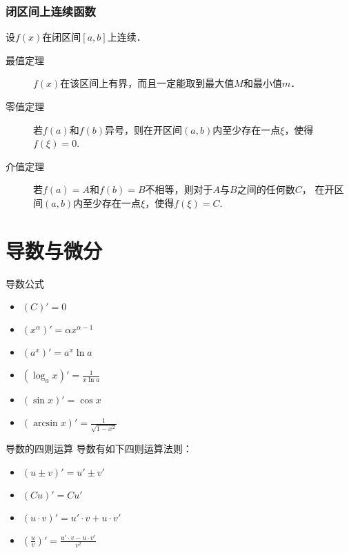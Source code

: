 \documentclass[14pt,notheorems,leqno,xcolor={rgb}]{beamer} %
\begin{document}
\begin{frame}
\frametitle{闭区间上连续函数}
设$f(x)$在闭区间$[a,b]$上连续．\vpause
\begin{description}
  \item[最值定理] $f(x)$在该区间上有界，而且一定能取到最大值$M$和最小值$m$．\vpause
  \item[零值定理] 若$f(a)$和$f(b)$异号，则在开区间$(a,b)$内至少存在一点$\xi$，使得$f(\xi)=0$.\vpause
  \item[介值定理] 若$f(a)=A$和$f(b)=B$不相等，则对于$A$与$B$之间的任何数$C$，
在开区间$(a,b)$内至少存在一点$\xi$，使得$f(\xi)=C$.
\end{description}
\end{frame}

\section{导数与微分}

\begin{frame}{导数公式}\transsplithorizontalout %
\begin{itemize}[<+->]
\item $(C)'=0$
\item $(x^\alpha)'=\alpha x^{\alpha-1}$
\item $(a^x)'=a^x \ln a$
\item $(\log_a x)'=\frac{1}{x\ln a}$
\item $(\sin x)'=\cos x$
\item $(\arcsin x)'=\frac{1}{\sqrt{1-x^2}}$
\end{itemize}
\end{frame}

\begin{frame}{导数的四则运算}\transsplitverticalin %
导数有如下四则运算法则：
\begin{itemize}[<+->]
\item $(u \pm v)' = u' \pm v'$
\item $(Cu)' = Cu'$
\item $(u \cdot v)'=u'\cdot v+u\cdot v'$
\item $\displaystyle\left(\frac{u}{v}\right)'=\frac{u'\cdot v-u\cdot v'}{v^2}$
\end{itemize}
\end{frame}
\end{document}
